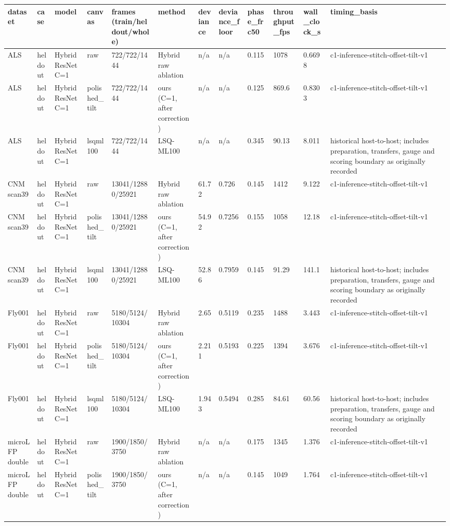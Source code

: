 \begin{tabular}{llllllllllll}
\toprule
dataset & case & model & canvas & frames (train/heldout/whole) & method & deviance & deviance\_floor & phase\_frc50 & throughput\_fps & wall\_clock\_s & timing\_basis \\
\midrule
ALS & heldout & Hybrid ResNet C=1 & raw & 722/722/1444 & Hybrid raw ablation & n/a & n/a & 0.115 & 1078 & 0.6698 & c1-inference-stitch-offset-tilt-v1 \\
ALS & heldout & Hybrid ResNet C=1 & polished\_tilt & 722/722/1444 & ours (C=1, after correction) & n/a & n/a & 0.125 & 869.6 & 0.8303 & c1-inference-stitch-offset-tilt-v1 \\
ALS & heldout & Hybrid ResNet C=1 & lsqml100 & 722/722/1444 & LSQ-ML100 & n/a & n/a & 0.345 & 90.13 & 8.011 & historical host-to-host; includes preparation, transfers, gauge and scoring boundary as originally recorded \\
CNM scan39 & heldout & Hybrid ResNet C=1 & raw & 13041/12880/25921 & Hybrid raw ablation & 61.72 & 0.726 & 0.145 & 1412 & 9.122 & c1-inference-stitch-offset-tilt-v1 \\
CNM scan39 & heldout & Hybrid ResNet C=1 & polished\_tilt & 13041/12880/25921 & ours (C=1, after correction) & 54.92 & 0.7256 & 0.155 & 1058 & 12.18 & c1-inference-stitch-offset-tilt-v1 \\
CNM scan39 & heldout & Hybrid ResNet C=1 & lsqml100 & 13041/12880/25921 & LSQ-ML100 & 52.86 & 0.7959 & 0.145 & 91.29 & 141.1 & historical host-to-host; includes preparation, transfers, gauge and scoring boundary as originally recorded \\
Fly001 & heldout & Hybrid ResNet C=1 & raw & 5180/5124/10304 & Hybrid raw ablation & 2.65 & 0.5119 & 0.235 & 1488 & 3.443 & c1-inference-stitch-offset-tilt-v1 \\
Fly001 & heldout & Hybrid ResNet C=1 & polished\_tilt & 5180/5124/10304 & ours (C=1, after correction) & 2.211 & 0.5193 & 0.225 & 1394 & 3.676 & c1-inference-stitch-offset-tilt-v1 \\
Fly001 & heldout & Hybrid ResNet C=1 & lsqml100 & 5180/5124/10304 & LSQ-ML100 & 1.943 & 0.5494 & 0.285 & 84.61 & 60.56 & historical host-to-host; includes preparation, transfers, gauge and scoring boundary as originally recorded \\
microLFP double & heldout & Hybrid ResNet C=1 & raw & 1900/1850/3750 & Hybrid raw ablation & n/a & n/a & 0.175 & 1345 & 1.376 & c1-inference-stitch-offset-tilt-v1 \\
microLFP double & heldout & Hybrid ResNet C=1 & polished\_tilt & 1900/1850/3750 & ours (C=1, after correction) & n/a & n/a & 0.145 & 1049 & 1.764 & c1-inference-stitch-offset-tilt-v1 \\

\end{tabular}
